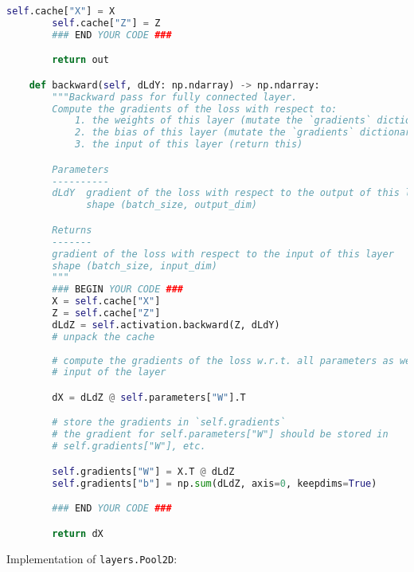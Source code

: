 \begin{lstlisting}[language=Python]
        self.cache["X"] = X
        self.cache["Z"] = Z
        ### END YOUR CODE ###

        return out

    def backward(self, dLdY: np.ndarray) -> np.ndarray:
        """Backward pass for fully connected layer.
        Compute the gradients of the loss with respect to:
            1. the weights of this layer (mutate the `gradients` dictionary)
            2. the bias of this layer (mutate the `gradients` dictionary)
            3. the input of this layer (return this)

        Parameters
        ----------
        dLdY  gradient of the loss with respect to the output of this layer
              shape (batch_size, output_dim)

        Returns
        -------
        gradient of the loss with respect to the input of this layer
        shape (batch_size, input_dim)
        """
        ### BEGIN YOUR CODE ###
        X = self.cache["X"]
        Z = self.cache["Z"]
        dLdZ = self.activation.backward(Z, dLdY)
        # unpack the cache
        
        # compute the gradients of the loss w.r.t. all parameters as well as the
        # input of the layer

        dX = dLdZ @ self.parameters["W"].T

        # store the gradients in `self.gradients`
        # the gradient for self.parameters["W"] should be stored in
        # self.gradients["W"], etc.

        self.gradients["W"] = X.T @ dLdZ
        self.gradients["b"] = np.sum(dLdZ, axis=0, keepdims=True)

        ### END YOUR CODE ###

        return dX

\end{lstlisting}

Implementation of \texttt{layers.Pool2D}:

